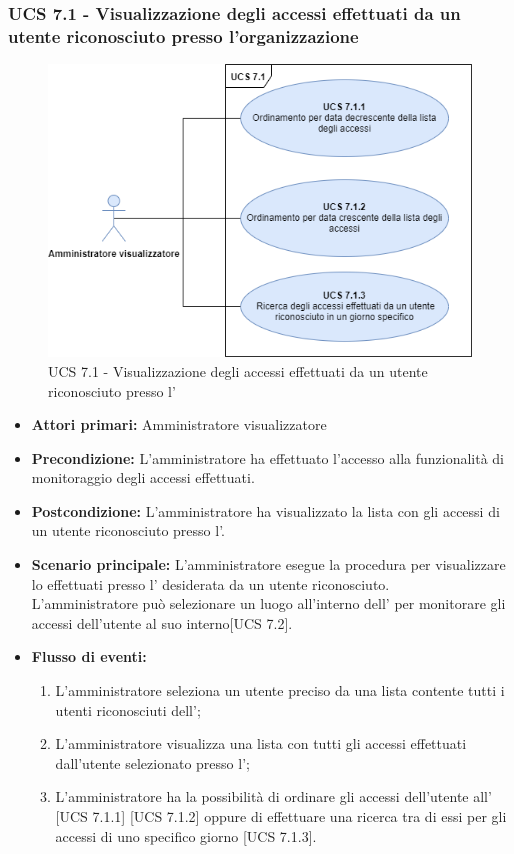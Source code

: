 \subsubsection{UCS 7.1 - Visualizzazione degli accessi effettuati da un utente riconosciuto presso l'organizzazione}
\begin{figure}[h]
	\centering
	\includegraphics[scale=0.4]{Sezioni/UseCase/Immagini/UCS7.1.png}
	\caption{UCS 7.1 - Visualizzazione degli accessi effettuati da un utente riconosciuto presso l'}
\end{figure}
\begin{itemize}
	\item \textbf{Attori primari:} Amministratore visualizzatore
	\item \textbf{Precondizione:} L'amministratore ha effettuato l'accesso alla funzionalità di monitoraggio degli accessi effettuati.
	\item \textbf{Postcondizione:} L'amministratore ha visualizzato la lista con gli accessi di un utente riconosciuto presso l'.
	\item \textbf{Scenario principale:} L'amministratore esegue la procedura per visualizzare lo  effettuati presso l' desiderata da un utente riconosciuto.\\
	L'amministratore può selezionare un luogo all'interno dell' per monitorare gli accessi dell'utente al suo interno[UCS 7.2].
	\item \textbf{Flusso di eventi:}
	\begin{enumerate}
	\item L'amministratore seleziona un utente preciso da una lista contente tutti i utenti riconosciuti dell';
	\item L'amministratore visualizza una lista con tutti gli accessi effettuati dall'utente selezionato presso l';
	\item L'amministratore ha la possibilità di ordinare gli accessi dell'utente all' [UCS 7.1.1] [UCS 7.1.2] oppure di effettuare una ricerca tra di essi per gli accessi di uno specifico giorno [UCS 7.1.3].
	\end{enumerate}
\end{itemize}

